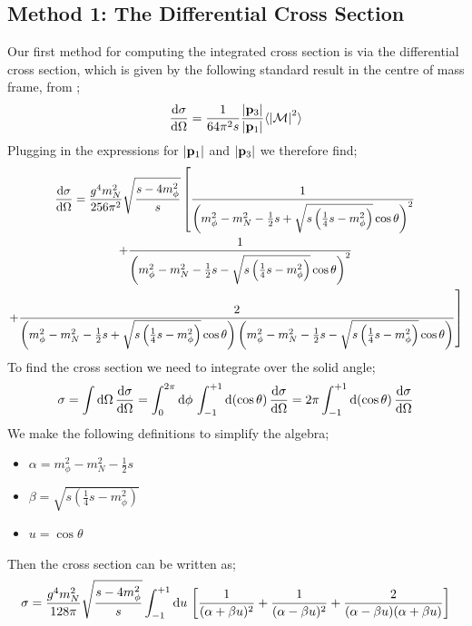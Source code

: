 \documentclass[10pt]{article}
\begin{document}
\subsection{Method 1: The Differential Cross Section}
Our first method for computing the integrated cross section is via the differential cross section, which is given by the following standard result in the centre of mass frame, from \cite{Thomson:2013zua};
\begin{equation}
\frac{\text{d} \sigma}{\text{d} \Omega} = \frac{1}{64 \pi^2 s}\frac{\left| \mathbf{p}_3 \right|}{\left| \mathbf{p}_1 \right|} \langle \left| \mathcal{M} \right|^2 \rangle
\end{equation}
Plugging in the expressions for $\left| \mathbf{p}_1 \right|$ and $\left| \mathbf{p}_3 \right|$ we therefore find;
\begin{multline*}
\frac{\text{d} \sigma}{\text{d} \Omega} = \frac{g^4 m_N^2}{256 \pi^2}\sqrt{\frac{s - 4m_\phi^2}{s}}\left[ \frac{1}{\left(m_\phi^2 - m_N^2 - \frac{1}{2}s + \sqrt{s\left(\frac{1}{4}s - m_\phi^2\right)}\cos\theta\right)^2} \right. \\ \left. +  \frac{1}{\left(m_\phi^2 - m_N^2 - \frac{1}{2}s - \sqrt{s\left(\frac{1}{4}s - m_\phi^2\right)}\cos\theta\right)^2} \right. \\ \left. + \frac{2}{\left(m_\phi^2 - m_N^2 - \frac{1}{2}s + \sqrt{s\left(\frac{1}{4}s - m_\phi^2\right)}\cos\theta\right)\left(m_\phi^2 - m_N^2 - \frac{1}{2}s - \sqrt{s\left(\frac{1}{4}s - m_\phi^2\right)}\cos\theta\right)}  \right]
\end{multline*}
To find the cross section we need to integrate over the solid angle;
\begin{equation}
\sigma = \int{\text{d}\Omega \,\frac{\text{d}\sigma}{\text{d}\Omega}} = \int_{0}^{2\pi}{\text{d}\phi \,\int_{-1}^{+1}{\text{d}(\cos\theta) \,\frac{\text{d}\sigma}{\text{d} \Omega}}} = 2\pi \int_{-1}^{+1}{\text{d}(\cos\theta) \,\frac{\text{d}\sigma}{\text{d}\Omega}}
\end{equation}
We make the following definitions to simplify the algebra;
\begin{itemize}
\item $\alpha = m_\phi^2 - m_N^2 - \frac{1}{2}s$
\item $\beta = \sqrt{s\left(\frac{1}{4}s - m_\phi^2\right)}$
\item $u = \cos\theta$
\end{itemize}
Then the cross section can be written as;
\begin{equation*}
\sigma = \frac{g^4 m_N^2}{128 \pi}\sqrt{\frac{s - 4m_\phi^2}{s}}\int_{-1}^{+1}{\text{d}u \,\left[\frac{1}{(\alpha + \beta u)^2} + \frac{1}{(\alpha - \beta u)^2} + \frac{2}{(\alpha - \beta u)(\alpha + \beta u)}\right]}
\end{equation*}
\end{document}
